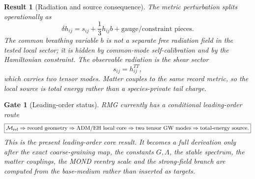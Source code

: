 \documentclass[11pt]{article}
\newtheorem{result}{Result}
\newtheorem{gate}{Gate}
\begin{document}
\begin{result}[Radiation and source consequence]
The metric perturbation splits operationally as
\[
\boxed{
\delta h_{ij}
=
s_{ij}
+\frac13 h_{ij}b
+\text{gauge/constraint pieces}.
}
\]
The common breathing variable \(b\) is not a separate free radiation field in
the tested local sector; it is hidden by common-mode self-calibration and by
the Hamiltonian constraint.  The observable radiation is the shear sector
\[
\boxed{
s_{ij}=h_{ij}^{TT},
}
\]
which carries two tensor modes.  Matter couples to the same record metric, so
the local source is total energy rather than a species-private tail charge.
\end{result}

\begin{gate}[Leading-order status]
RMG currently has a conditional leading-order route
\[
\boxed{
\mathcal M_{\rm rel}
\Rightarrow
\text{record geometry}
\Rightarrow
\text{ADM/EH local core}
\Rightarrow
\text{two tensor GW modes}
\Rightarrow
\text{total-energy source}.
}
\]
This is the present leading-order core result.  It becomes a full derivation
only after the exact coarse-graining map, the constants \(G,\Lambda\), the
stable spectrum, the matter couplings, the MOND reentry scale and the
strong-field branch are computed from the base-medium rather than inserted as
targets.
\end{gate}
\end{document}
